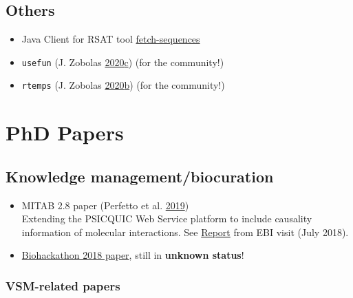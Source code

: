 \documentclass[
  12pt,
]{book}
\providecommand{\tightlist}{%
  \setlength{\itemsep}{0pt}\setlength{\parskip}{0pt}}
\begin{document}
\hypertarget{others}{%
\section*{Others}\label{others}}

\begin{itemize}
\tightlist
\item
  Java Client for RSAT tool \href{https://github.com/bblodfon/rsat-rest-java-clients}{fetch-sequences}
\item
  \texttt{usefun} (J. Zobolas \protect\hyperlink{ref-R-usefun}{2020}\protect\hyperlink{ref-R-usefun}{c}) (for the community!)
\item
  \texttt{rtemps} (J. Zobolas \protect\hyperlink{ref-R-rtemps}{2020}\protect\hyperlink{ref-R-rtemps}{b}) (for the community!)
\end{itemize}

\hypertarget{phd-papers}{%
\chapter{PhD Papers}\label{phd-papers}}

\hypertarget{knowledge-managementbiocuration}{%
\section*{Knowledge management/biocuration}\label{knowledge-managementbiocuration}}

\begin{itemize}
\tightlist
\item
  MITAB 2.8 paper (Perfetto et al. \protect\hyperlink{ref-Perfetto2019}{2019})\\
  Extending the PSICQUIC Web Service platform to include causality information of molecular interactions.
  See \href{http://tiny.cc/psicquic-mitab28}{Report} from EBI visit (July 2018).
\item
  \href{https://www.tinyurl.com/bh2018write}{Biohackathon 2018 paper}, still in \textbf{unknown status}!
\end{itemize}

\hypertarget{vsm-related-papers}{%
\subsection*{VSM-related papers}\label{vsm-related-papers}}
\end{document}
